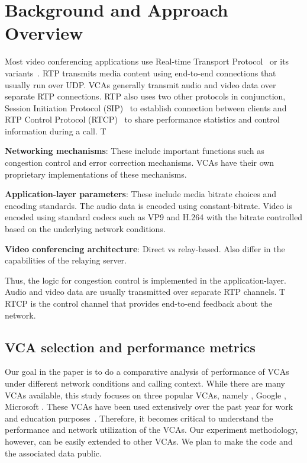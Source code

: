 \section{Background and Approach Overview}
\label{sec:background}
Most video conferencing applications use Real-time Transport Protocol~\cite{schulzrinne1996rtp, schulzrinne2003rfc3550} or its variants~\cite{baugher2004secure, zoom_rtp}. RTP transmits media content using end-to-end connections that usually run over UDP. VCAs generally transmit audio and video data over separate RTP connections. RTP also uses two other protocols in conjunction, Session Initiation Protocol (SIP)~\cite{rosenberg2002sip} to establish connection between clients and RTP Control Protocol (RTCP)~\cite{schulzrinne2003rfc3550} to share performance statistics and control information during a call. T  



\textbf{Networking mechanisms}: These include important functions such as congestion control and error correction mechanisms. VCAs have their own proprietary implementations of these mechanisms. 

\textbf{Application-layer parameters}: These include media bitrate choices and encoding standards. The audio data is encoded using constant-bitrate. Video is encoded using standard codecs such as VP9 and H.264 with the bitrate controlled based on the underlying network conditions.

\textbf{Video conferencing architecture}: Direct vs relay-based. Also differ in the capabilities of the relaying server. 




Thus, the logic for congestion control is implemented in the application-layer. Audio and video data are usually transmitted over separate RTP channels. T RTCP is the control channel that provides end-to-end feedback about the network. 



\subsection{VCA selection and performance metrics}
Our goal in the paper is to do a comparative analysis of performance of VCAs under different network conditions and calling context. While there are many VCAs available, this study focuses on three popular VCAs, namely \zoom, Google \meet, Microsoft \teams. These VCAs have been used extensively over the past year for work and education purposes~\cite{}. Therefore, it becomes critical to understand the performance and network utilization of the VCAs. Our experiment methodology, however, can be easily extended to other VCAs. We plan to make the code and the associated data public. 



